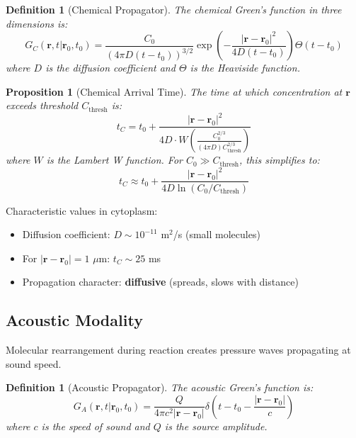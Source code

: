 \documentclass[11pt,a4paper]{article}
\newtheorem{definition}[theorem]{Definition}
\newtheorem{proposition}[theorem]{Proposition}
\theoremstyle{remark}
\newcommand{\rxnpos}{\mathbf{r}_0}
\newcommand{\rxntime}{t_0}
\newcommand{\obspos}{\mathbf{r}}
\begin{document}
\begin{definition}[Chemical Propagator]
The chemical Green's function in three dimensions is:
\begin{equation}
    G_C(\mathbf{r}, t | \rxnpos, \rxntime) = \frac{C_0}{(4\pi D (t-\rxntime))^{3/2}} \exp\left(-\frac{|\mathbf{r} - \rxnpos|^2}{4D(t-\rxntime)}\right) \Theta(t - \rxntime)
\end{equation}
where $D$ is the diffusion coefficient and $\Theta$ is the Heaviside function.
\end{definition}

\begin{proposition}[Chemical Arrival Time]
\label{prop:chem_arrival}
The time at which concentration at $\obspos$ exceeds threshold $C_{\text{thresh}}$ is:
\begin{equation}
    t_C = \rxntime + \frac{|\obspos - \rxnpos|^2}{4D \cdot W\left(\frac{C_0^{2/3}}{(4\pi D)C_{\text{thresh}}^{2/3}}\right)}
\end{equation}
where $W$ is the Lambert W function. For $C_0 \gg C_{\text{thresh}}$, this simplifies to:
\begin{equation}
    t_C \approx \rxntime + \frac{|\obspos - \rxnpos|^2}{4D \ln(C_0/C_{\text{thresh}})}
\end{equation}
\end{proposition}

Characteristic values in cytoplasm:
\begin{itemize}
    \item Diffusion coefficient: $D \sim 10^{-11}$ m$^2$/s (small molecules)
    \item For $|\obspos - \rxnpos| = 1$ $\mu$m: $t_C \sim 25$ ms
    \item Propagation character: \textbf{diffusive} (spreads, slows with distance)
\end{itemize}

\subsection{Acoustic Modality}

Molecular rearrangement during reaction creates pressure waves propagating at sound speed.

\begin{definition}[Acoustic Propagator]
The acoustic Green's function is:
\begin{equation}
    G_A(\mathbf{r}, t | \rxnpos, \rxntime) = \frac{Q}{4\pi c^2 |\mathbf{r} - \rxnpos|} \delta\left(t - \rxntime - \frac{|\mathbf{r} - \rxnpos|}{c}\right)
\end{equation}
where $c$ is the speed of sound and $Q$ is the source amplitude.
\end{definition}
\end{document}
